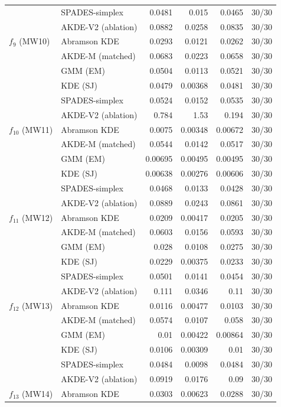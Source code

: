 \begin{tabular}{llrrrr}
 & SPADES-simplex & 0.0481 & 0.015 & 0.0465 & 30/30 \\
 & AKDE-V2 (ablation) & 0.0882 & 0.0258 & 0.0835 & 30/30 \\
$f_{9}$ (MW10) & Abramson KDE & 0.0293 & 0.0121 & 0.0262 & 30/30 \\
 & AKDE-M (matched) & 0.0683 & 0.0223 & 0.0658 & 30/30 \\
 & GMM (EM) & 0.0504 & 0.0113 & 0.0521 & 30/30 \\
 & KDE (SJ) & 0.0479 & 0.00368 & 0.0481 & 30/30 \\
 & SPADES-simplex & 0.0524 & 0.0152 & 0.0535 & 30/30 \\
 & AKDE-V2 (ablation) & 0.784 & 1.53 & 0.194 & 30/30 \\
$f_{10}$ (MW11) & Abramson KDE & 0.0075 & 0.00348 & 0.00672 & 30/30 \\
 & AKDE-M (matched) & 0.0544 & 0.0142 & 0.0517 & 30/30 \\
 & GMM (EM) & 0.00695 & 0.00495 & 0.00495 & 30/30 \\
 & KDE (SJ) & 0.00638 & 0.00276 & 0.00606 & 30/30 \\
 & SPADES-simplex & 0.0468 & 0.0133 & 0.0428 & 30/30 \\
 & AKDE-V2 (ablation) & 0.0889 & 0.0243 & 0.0861 & 30/30 \\
$f_{11}$ (MW12) & Abramson KDE & 0.0209 & 0.00417 & 0.0205 & 30/30 \\
 & AKDE-M (matched) & 0.0603 & 0.0156 & 0.0593 & 30/30 \\
 & GMM (EM) & 0.028 & 0.0108 & 0.0275 & 30/30 \\
 & KDE (SJ) & 0.0229 & 0.00375 & 0.0233 & 30/30 \\
 & SPADES-simplex & 0.0501 & 0.0141 & 0.0454 & 30/30 \\
 & AKDE-V2 (ablation) & 0.111 & 0.0346 & 0.11 & 30/30 \\
$f_{12}$ (MW13) & Abramson KDE & 0.0116 & 0.00477 & 0.0103 & 30/30 \\
 & AKDE-M (matched) & 0.0574 & 0.0107 & 0.058 & 30/30 \\
 & GMM (EM) & 0.01 & 0.00422 & 0.00864 & 30/30 \\
 & KDE (SJ) & 0.0106 & 0.00309 & 0.01 & 30/30 \\
 & SPADES-simplex & 0.0484 & 0.0098 & 0.0484 & 30/30 \\
 & AKDE-V2 (ablation) & 0.0919 & 0.0176 & 0.09 & 30/30 \\
$f_{13}$ (MW14) & Abramson KDE & 0.0303 & 0.00623 & 0.0288 & 30/30 \\

\end{tabular}
